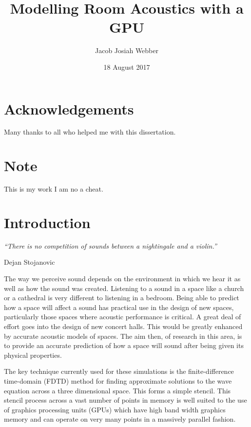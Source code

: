 \documentclass[12pt,a4paper]{article}
\begin{document}
\title{Modelling Room Acoustics with a GPU}
\author{Jacob Josiah Webber}
\date{18 August 2017}

\makeEPCCtitle

\thispagestyle{empty}

\newpage


\tableofcontents

\newpage

\section*{Acknowledgements}

Many thanks to all who helped me with this dissertation.

\section*{Note}

This is my work I am no a cheat.



\newpage
{}

\section{Introduction}
\epigraph{\itshape ``There is no competition of sounds between a nightingale and a violin.''}{Dejan Stojanovic}

The way we perceive sound depends on the environment in which we hear it as well as how the sound was created. Listening to a sound in a space like a church or a cathedral is very different to listening in a bedroom. Being able to predict how a space will affect a sound has practical use in the design of new spaces, particularly those spaces where acoustic performance is critical. A great deal of effort goes into the design of new concert halls. This would be greatly enhanced by accurate acoustic models of spaces. The aim then, of research in this area, is to provide an accurate prediction of how a space will sound after being given its physical properties.

The key technique currently used for these simulations is the finite-difference time-domain (FDTD) method for finding approximate solutions to the wave equation across a three dimensional space. This forms a simple stencil. This stencil process across a vast number of points in memory is well suited to the use of graphics processing units (GPUs) which have high band width graphics memory and can operate on very many points in a massively parallel fashion.
\end{document}
